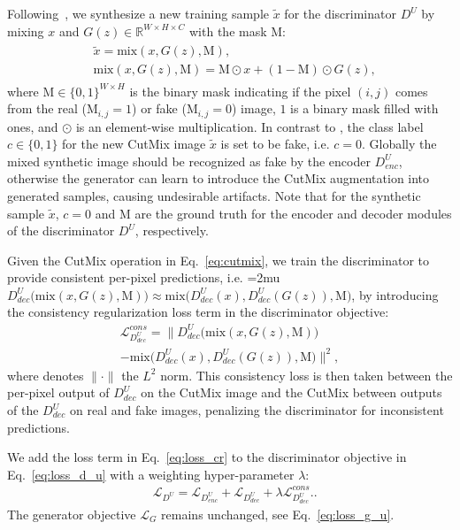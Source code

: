 \documentclass[10pt,twocolumn,letterpaper]{article}
\begin{document}
Following~\cite{Yun2019CutMixRS}, we
synthesize a new training sample $\tilde{x}$ for the discriminator $D^U$ by mixing $x$ and $G(z) \in \mathbb{R}^{W\times H \times C}$ with the mask $\mathrm{M}$:
\begin{align}
\begin{array}{ll}
& \tilde{x} = \mathrm{mix} (x, G(z) , \mathrm{M}), \\
& \mathrm{mix} (x, G(z) , \mathrm{M}) = \mathrm{M}  \odot x + (\mathrm{1}-\mathrm{M}) \odot G(z), \end{array} \label{eq:cutmix}
\end{align}
where $\mathrm{M} \in \{0,1\}^{W\times H}$ is the binary mask indicating if the pixel $(i,j)$ comes from the real ($\mathrm{M}_{i,j}=1$) or fake ($\mathrm{M}_{i,j}=0$) image, $\mathrm{1}$ is a binary mask filled with ones, and $\odot$ is an element-wise multiplication.
In contrast to \cite{Yun2019CutMixRS}, the class label $c \in \{0,1\}$ for the new CutMix image $\tilde{x}$ is set to be fake, i.e. $c=0$. Globally the mixed synthetic image should be recognized as fake by the encoder $D^U_{enc}$, otherwise the generator can learn to introduce the CutMix augmentation
into generated samples, causing undesirable artifacts.
Note that for the synthetic sample $\tilde{x}$, $c=0$ and $\mathrm{M}$ are the ground truth for the encoder and decoder modules of the discriminator $D^U$, respectively.




Given the CutMix operation in Eq.~\ref{eq:cutmix}, we train the discriminator to provide consistent per-pixel predictions, i.e.
{\thickmuskip=2mu $D^U_{dec}\big(\mathrm{mix}(x, G(z), \mathrm{M})\big) \approx \mathrm{mix}\big(D^U_{dec}(x),D^U_{dec}(G(z)), \mathrm{M}\big)$}, by introducing the consistency regularization loss term in the discriminator objective:
\begin{multline}
\mathcal{L}^{cons}_{D^U_{dec}} =  \Big\|D^U_{dec}\Big(\mathrm{mix} (x, G(z), \mathrm{M})\Big) \\
- \mathrm{mix} \Big(D^U_{dec}(x), D^U_{dec}(G(z)), \mathrm{M}\Big)\Big\|^2,  \label{eq:loss_cr}
\end{multline}
where denotes $\|\cdot\|$ the $L^2$ norm.
This consistency loss is then taken between the per-pixel output of $D^U_{dec}$ on the
CutMix image and the CutMix between outputs of the $D^U_{dec}$ on real and fake images, penalizing the discriminator for inconsistent predictions.

We add the loss term in Eq.~\ref{eq:loss_cr} to the discriminator objective in Eq.~\ref{eq:loss_d_u} with a weighting hyper-parameter $\lambda$:
\begin{align}
& \mathcal{L}_{D^U}  = \mathcal{L}_{D^U_{enc}} + \mathcal{L}_{D^U_{dec}} +\lambda \mathcal{L}^{cons}_{D^U_{dec}}. \label{eq:fin_loss_d_u}.
\end{align}
The generator objective $\mathcal{L}_{G}$ remains unchanged, see Eq.~\ref{eq:loss_g_u}.
\end{document}
